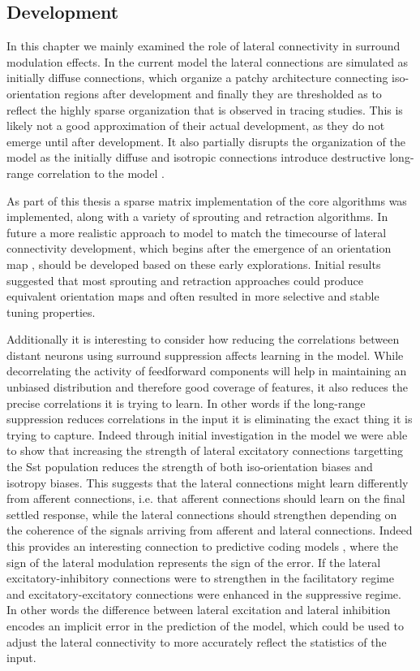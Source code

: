\subsection{Development}

In this chapter we mainly examined the role of lateral connectivity in
surround modulation effects. In the current model the lateral
connections are simulated as initially diffuse connections, which
organize a patchy architecture connecting iso-orientation regions
after development and finally they are thresholded as to reflect the
highly sparse organization that is observed in tracing studies. This
is likely not a good approximation of their actual development, as
they do not emerge until after development. It also partially disrupts
the organization of the model as the initially diffuse and isotropic
connections introduce destructive long-range correlation to the model
\citep{Miikkulainen2005}.

As part of this thesis a sparse matrix implementation of the core
algorithms was implemented, along with a variety of sprouting and
retraction algorithms. In future a more realistic approach to model to
match the timecourse of lateral connectivity development, which begins
after the emergence of an orientation map \citep{Ruthazer1996}, should
be developed based on these early explorations. Initial results
suggested that most sprouting and retraction approaches could produce
equivalent orientation maps and often resulted in more selective and
stable tuning properties.

Additionally it is interesting to consider how reducing the
correlations between distant neurons using surround suppression
affects learning in the model. While decorrelating the activity of
feedforward components will help in maintaining an unbiased
distribution and therefore good coverage of features, it also reduces
the precise correlations it is trying to learn. In other words if the
long-range suppression reduces correlations in the input it is
eliminating the exact thing it is trying to capture. Indeed through
initial investigation in the model we were able to show that
increasing the strength of lateral excitatory connections targetting
the Sst population reduces the strength of both iso-orientation biases
and isotropy biases. This suggests that the lateral connections might
learn differently from afferent connections, i.e. that afferent
connections should learn on the final settled response, while the
lateral connections should strengthen depending on the coherence of
the signals arriving from afferent and lateral connections. Indeed
this provides an interesting connection to predictive coding models
\citep{Rao1999}, where the sign of the lateral modulation represents
the sign of the error. If the lateral excitatory-inhibitory
connections were to strengthen in the facilitatory regime and
excitatory-excitatory connections were enhanced in the suppressive
regime. In other words the difference between lateral excitation and
lateral inhibition encodes an implicit error in the prediction of the
model, which could be used to adjust the lateral connectivity to more
accurately reflect the statistics of the input.


